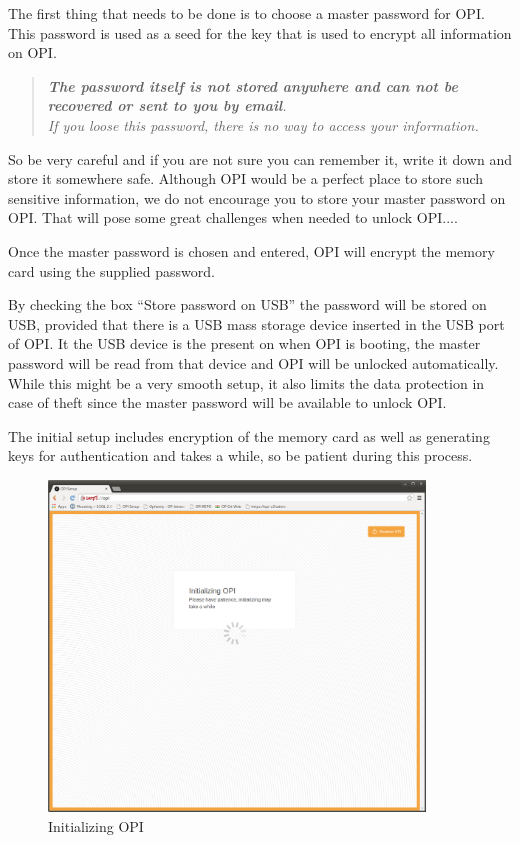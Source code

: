 \documentclass[12pt,a4paper,titlepage]{article}
\begin{document}
The first thing that needs to be done is to choose a master password for OPI. This password is used as a seed for the key that is used to encrypt all information on OPI.

\begin{quote}
\emph{\textbf{The password itself is not stored anywhere and can not be recovered or sent to you by email}.\\
If you loose this password, there is no way to access your information.}
\end{quote}

So be very careful and if you are not sure you can remember it, write it down and store it somewhere safe. Although OPI would be a perfect place to store such sensitive information, we do not encourage you to store your master password on OPI.
That will pose some great challenges when needed to unlock OPI....

Once the master password is chosen and entered, OPI will encrypt the memory card using the supplied password.

By checking the box ``Store password on USB'' the password will be stored on USB, provided that there is a USB mass storage device inserted in the USB port of OPI. It the USB device is the present on when OPI is booting, the master password will be read from that device and OPI will be unlocked automatically. While this might be a very smooth setup, it also limits the data protection in case of theft since the master password will be available to unlock OPI.

The initial setup includes encryption of the memory card as well as generating keys for authentication and takes a while, so be patient during this process.
\begin{figure}[h]
\centering
\includegraphics[width=10cm]{./img/init}
\caption{Initializing OPI}
\end{figure}
\end{document}
